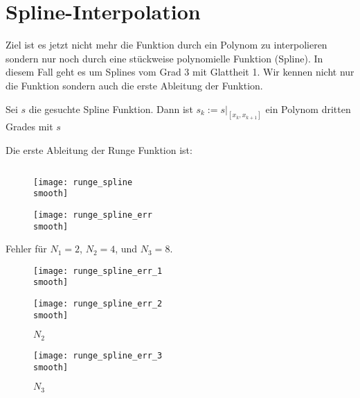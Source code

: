 \documentclass[]{scrartcl}
\begin{document}
	\section{Spline-Interpolation}
	
	Ziel ist es jetzt nicht mehr die Funktion  durch ein Polynom zu interpolieren sondern nur noch durch eine stückweise polynomielle Funktion (Spline). In diesem Fall geht es um Splines vom Grad 3 mit Glattheit 1. Wir kennen nicht nur die Funktion sondern auch die erste Ableitung der Funktion.
	
	Sei $s$ die gesuchte Spline Funktion. Dann ist $s_k:=s|_{[x_k,x_{k+1}]}$ ein Polynom dritten Grades mit $s$
	
	
	Die erste Ableitung der Runge Funktion ist:
	
	\[\]
	
	
	\begin{figure}[H]
		\centering
		\begin{minipage}{0.5\textwidth}
			\texttt{[image: runge\_spline\\smooth]}
			\caption{\label{Abb.5}}
		\end{minipage}
		\begin{minipage}{0.49\textwidth}
			\texttt{[image: runge\_spline\_err\\smooth]}
			\caption{\label{Abb.6}}
		\end{minipage}
	\end{figure}
	
	Fehler für $N_1=2$, $N_2=4$, und $N_3=8$.
	\begin{figure}[H]
 		\centering
 		\begin{minipage}{0.5\textwidth}
 			\texttt{[image: runge\_spline\_err\_1\\smooth]}
 			\caption{$N_1$\label{Abb.7}}
 		\end{minipage}
 		\begin{minipage}{0.49\textwidth}
 			\texttt{[image: runge\_spline\_err\_2\\smooth]}
 			\caption{$N_2$\label{Abb.8}}
 		\end{minipage}
 	\end{figure}
 	
 	\begin{figure}[H]
 		\centering
		\texttt{[image: runge\_spline\_err\_3\\smooth]}
		\caption{$N_3$\label{Abb.9}}
 	\end{figure}
 	
\end{document}
